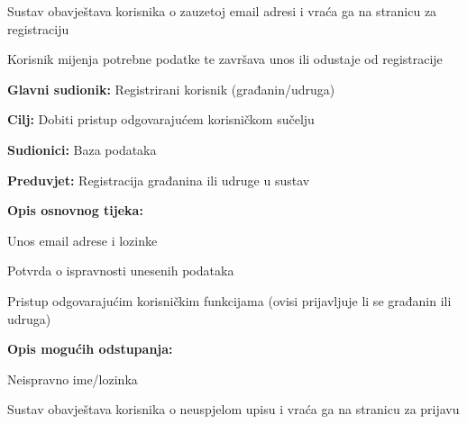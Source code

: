 \begin{packed_item}
\begin{packed_item}
\begin{packed_enum}
						\item Sustav obavještava korisnika o zauzetoj email adresi i vraća ga na stranicu za registraciju
						\item Korisnik mijenja potrebne podatke te završava unos ili odustaje od registracije
					
				\end{packed_enum}
				\end{packed_item}
			\end{packed_item}
		
		
		
			\noindent {}
			\begin{packed_item}
				
				\item \textbf{Glavni sudionik:} Registrirani korisnik (građanin/udruga)
				\item  \textbf{Cilj:} Dobiti pristup odgovarajućem korisničkom sučelju
				\item  \textbf{Sudionici:} Baza podataka
				\item  \textbf{Preduvjet:} Registracija građanina ili udruge u sustav
				\item  \textbf{Opis osnovnog tijeka:}
				
				\item[] \begin{packed_enum}
					
					\item Unos email adrese i lozinke
					\item Potvrda o ispravnosti unesenih podataka
					\item Pristup odgovarajućim korisničkim funkcijama (ovisi prijavljuje li se građanin ili udruga)
				\end{packed_enum}
				
				\item  \textbf{Opis mogućih odstupanja:}
				
				\item[] \begin{packed_item}
					
					\item [2.a] Neispravno ime/lozinka
					\item[] \begin{packed_enum}
						
						\item Sustav obavještava korisnika o neuspjelom upisu i vraća ga na stranicu za prijavu
						
					\end{packed_enum}
				\end{packed_item}
			\end{packed_item}
		
